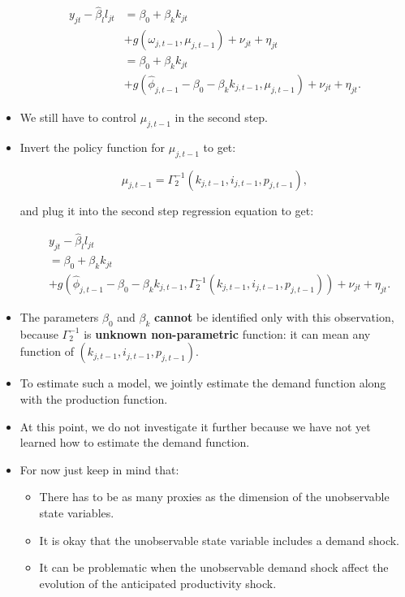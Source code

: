 \documentclass[]{book}
\providecommand{\tightlist}{%
  \setlength{\itemsep}{0pt}\setlength{\parskip}{0pt}}
\theoremstyle{definition}
\theoremstyle{definition}
\theoremstyle{definition}
\theoremstyle{remark}
\begin{document}
\begin{itemize}
  \begin{equation}
  \begin{split}
  y_{jt} - \hat{\beta}_l l_{jt} 
  &= \beta_0 + \beta_k k_{jt}\\
  & + g(\omega_{j, t - 1}, \mu_{j, t - 1}) + \nu_{jt} + \eta_{jt}\\
  &= \beta_0 + \beta_k k_{jt}\\
  & + g(\hat{\phi}_{j, t - 1} - \beta_0 - \beta_k k_{j, t - 1}, \mu_{j, t - 1}) + \nu_{jt} + \eta_{jt}.
  \end{split}
  \end{equation}
\item
  We still have to control \(\mu_{j, t - 1}\) in the second step.
\item
  Invert the policy function for \(\mu_{j, t - 1}\) to get:

  \begin{equation}
  \mu_{j, t - 1} = \Gamma_2^{- 1}(k_{j, t - 1}, i_{j, t - 1}, p_{j, t - 1}),
  \end{equation}

  and plug it into the second step regression equation to get:

  \begin{equation}
  \begin{split}
  &y_{jt} - \hat{\beta}_l l_{jt}\\
  &= \beta_0 + \beta_k k_{jt}\\
  &+g(\hat{\phi}_{j, t - 1} - \beta_0 - \beta_k k_{j, t - 1}, \Gamma_2^{- 1}(k_{j, t - 1}, i_{j, t - 1}, p_{j, t - 1})) + \nu_{jt} + \eta_{jt}.
  \end{split}
  \end{equation}
\item
  The parameters \(\beta_0\) and \(\beta_k\) \textbf{cannot} be
  identified only with this observation, because \(\Gamma_2^{-1}\) is
  \textbf{unknown non-parametric} function: it can mean any function of
  \((k_{j, t - 1}, i_{j, t - 1}, p_{j, t - 1})\).
\item
  To estimate such a model, we jointly estimate the demand function
  along with the production function.
\item
  At this point, we do not investigate it further because we have not
  yet learned how to estimate the demand function.
\item
  For now just keep in mind that:

  \begin{itemize}
  \tightlist
  \item
    There has to be as many proxies as the dimension of the unobservable
    state variables.
  \item
    It is okay that the unobservable state variable includes a demand
    shock.
  \item
    It can be problematic when the unobservable demand shock affect the
    evolution of the anticipated productivity shock.
  \end{itemize}
\end{itemize}
\end{document}

